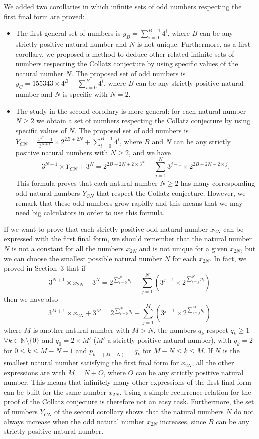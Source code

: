 \documentclass[11pt,a4paper]{article}
\newcommand{\N}{\mathbb{N}}
\newcommand{\Pf}[4]{2^{\sum_{#4=0}^{#1}#3_{#4}}-\sum_{j=1}^{#2}\left(3^{j-1}\times 2^{\sum_{#4=j}^{#1}#3_{#4}}\right)}
\theoremstyle{definition}
\begin{document}
We added two corollaries in which infinite sets of odd numbers respecting the first final
form are proved:
\begin{itemize}
\item The first general set of numbers is $y_B=\sum_{i=0}^{B-1}4^{i}$, where $B$ can be any
strictly positive natural number and $N$ is not unique. Furthermore, as a first corollary, we
proposed a method to deduce other related infinite sets of numbers respecting the Collatz
conjecture by using specific values of the natural number $N$. The proposed set of odd
numbers is $y_C=155343\times 4^{B}+\sum_{i=0}^{B}4^{i}$, where $B$ can be any strictly
positive natural number and $N$ is specific with $N=2$.
\item The study in the second corollary is more general: for each natural number $N\ge 2$ we
obtain a set of numbers respecting the Collatz conjecture by using specific values of $N$.
The proposed set of odd numbers is
$Y_{CN}=\frac{4^{3^{N}}-1}{3^{N+1}}\times 2^{2B+2N}+\sum_{i=0}^{B-1}4^{i}$, where $B$ and
$N$ can be any strictly positive natural numbers with $N\ge 2$, and we have
\[3^{N+1}\times Y_{CN}+3^{N}=2^{2B+2N+2\times 3^{N}}-\sum_{j=1}^{N}3^{j-1}\times 2^{2B+2N-2\times j}.\]
This formula proves that each natural number $N\ge 2$ has many corresponding odd natural
numbers $Y_{CN}$ that respect the Collatz conjecture. However, we remark that these odd numbers grow
rapidly and this means that we may need big calculators in order to use this formula.
\end{itemize}

If we want to prove that each strictly positive odd natural number $x_{2N}$ can be
expressed with the first final form, we should remember that the natural number $N$ is not a
constant for all the numbers $x_{2N}$ and is not unique for a given $x_{2N}$, but we can
choose the smallest possible natural number $N$ for each $x_{2N}$. In fact, we proved in
Section~3 that if
\[3^{N+1}\times x_{2N}+3^{N}=\Pf{N}{N}{p}{i}\]
then we have also
\[3^{M+1}\times x_{2N}+3^{M}=\Pf{M}{M}{q}{i}\]
where $M$ is another natural number with $M>N$, the numbers $q_k$ respect $q_k\ge 1$
$\forall k\in\N\setminus\{0\}$ and $q_0=2\times M'$ ($M'$ a strictly positive natural
number), with $q_k=2$ for $0\le k\le M-N-1$ and $p_{k-(M-N)}=q_k$ for $M-N\le k\le M$. If
$N$ is the smallest natural number satisfying the first final form for $x_{2N}$, all the
other expressions are with $M=N+O$, where $O$ can be any strictly positive natural number.
This means that infinitely many other expressions of the first final form can be built for
the same number $x_{2N}$. Using a simple recurrence relation for the proof of the Collatz
conjecture is therefore not an easy task. Furthermore, the set of numbers $Y_{CN}$ of the
second corollary shows that the natural numbers $N$ do not always increase when the odd
natural number $x_{2N}$ increases, since $B$ can be any strictly positive natural number.
\end{document}
